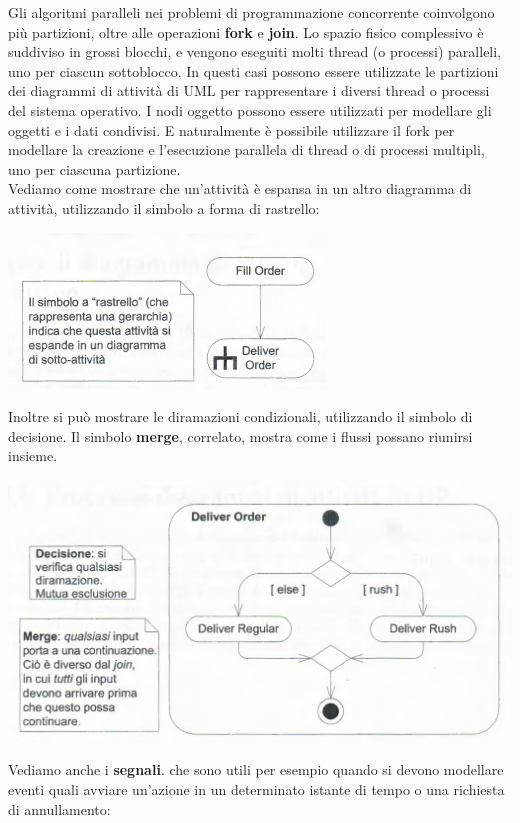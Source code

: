 \documentclass[a4paper,12pt, oneside]{book}
\begin{document}
Gli algoritmi paralleli nei problemi di
programmazione concorrente coinvolgono più partizioni, oltre alle operazioni \textbf{fork} e \textbf{join}. Lo spazio fisico complessivo è suddiviso in grossi blocchi, e vengono eseguiti molti thread (o processi) paralleli, uno per ciascun sottoblocco. In questi casi possono essere utilizzate le partizioni dei diagrammi di attività di UML per rappresentare i diversi thread o processi del sistema operativo. I nodi oggetto possono essere utilizzati per modellare gli oggetti e i dati condivisi. E naturalmente è possibile utilizzare il fork per modellare la creazione e l'esecuzione parallela di thread o di processi multipli, uno per ciascuna partizione.\\
Vediamo come mostrare che un'attività è espansa in un altro diagramma di attività, utilizzando il simbolo a forma di rastrello:
\begin{center}
	\includegraphics[scale=0.5]{img/atd4.png}
\end{center}	
Inoltre si può mostrare le diramazioni condizionali, utilizzando il simbolo di decisione. Il simbolo \textbf{merge}, correlato, mostra come i flussi possano riunirsi insieme.
\begin{center}
	\includegraphics[scale=0.5]{img/atd5.png}
\end{center}
Vediamo anche i \textbf{segnali}. che sono utili per esempio quando si devono modellare
eventi quali avviare un'azione in un determinato istante di tempo o una richiesta di annullamento:
\end{document}
